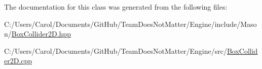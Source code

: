 The documentation for this class was generated from the following files\+:\begin{DoxyCompactItemize}
\item 
C\+:/\+Users/\+Carol/\+Documents/\+Git\+Hub/\+Team\+Does\+Not\+Matter/\+Engine/include/\+Mason/\hyperlink{_box_collider2_d_8hpp}{Box\+Collider2\+D.\+hpp}\item 
C\+:/\+Users/\+Carol/\+Documents/\+Git\+Hub/\+Team\+Does\+Not\+Matter/\+Engine/src/\hyperlink{_box_collider2_d_8cpp}{Box\+Collider2\+D.\+cpp}\end{DoxyCompactItemize}
